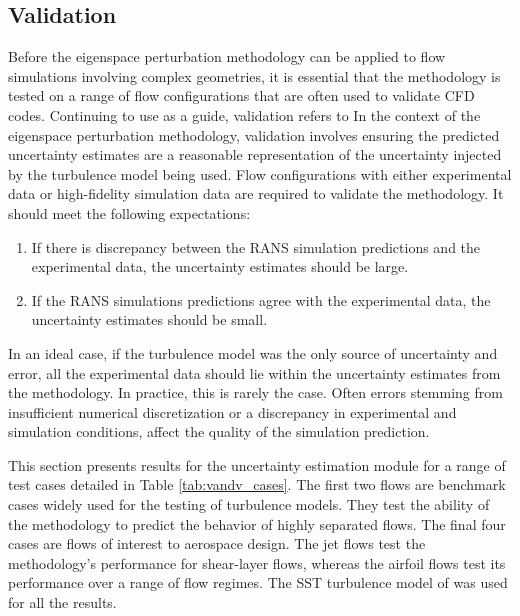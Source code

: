 \subsection{Validation} \label{sec:VandV_rans_uq}

Before the eigenspace perturbation methodology can be applied to flow simulations involving complex geometries, it is essential that the methodology is tested on a range of flow configurations that are often used to validate CFD codes. Continuing to use \cite{computational_fluid_dynamics_committee_guide_1998} as a guide, validation refers to 
 In the context of the eigenspace perturbation methodology, validation involves ensuring the predicted uncertainty estimates are a reasonable representation of the uncertainty injected by the turbulence model being used. Flow configurations with either experimental data or high-fidelity simulation data are required to validate the methodology. It should meet the following expectations:

\begin{enumerate}
    \item If there is discrepancy between the RANS simulation predictions and the experimental data, the uncertainty estimates should be large.
    \item If the RANS simulations predictions agree with the experimental data, the uncertainty estimates should be small. 
\end{enumerate}

In an ideal case, if the turbulence model was the only source of uncertainty and error, all the experimental data should lie within the uncertainty estimates from the methodology. In practice, this is rarely the case. Often errors stemming from insufficient numerical discretization or a discrepancy in experimental and simulation conditions, affect the quality of the simulation prediction. 

This section presents results for the uncertainty estimation module for a range of test cases detailed in Table \ref{tab:vandv_cases}. The first two flows are benchmark cases widely used for the testing of turbulence models. They test the ability of the methodology to predict the behavior of highly separated flows. The final four cases are flows of interest to aerospace design. The jet flows test the methodology's performance for shear-layer flows, whereas the airfoil flows test its performance over a range of flow regimes. The SST turbulence model of \cite{sst} was used for all the results. 

